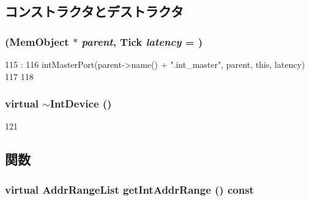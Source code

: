 \subsection{コンストラクタとデストラクタ}
\hypertarget{classX86ISA_1_1IntDevice_a860c06bf1cff1018280578ab96cdc37c}{
\subsubsection[{IntDevice}]{ ({\bf MemObject} $\ast$ {\em parent}, \/  {\bf Tick} {\em latency} = {})}}
\label{classX86ISA_1_1IntDevice_a860c06bf1cff1018280578ab96cdc37c}



\begin{DoxyCode}
115                                                     :
116         intMasterPort(parent->name() + ".int_master", parent, this, latency)
117     {
118     }

\end{DoxyCode}
\hypertarget{classX86ISA_1_1IntDevice_aa3d5db8cb913cc5f6e45e40f0d6b6f72}{
\subsubsection[{$\sim$IntDevice}]{\setlength{\rightskip}{0pt plus 5cm}virtual $\sim${\bf IntDevice} ()}}
\label{classX86ISA_1_1IntDevice_aa3d5db8cb913cc5f6e45e40f0d6b6f72}



\begin{DoxyCode}
121     {}
\end{DoxyCode}


\subsection{関数}
\hypertarget{classX86ISA_1_1IntDevice_ac142ed8f5e7f1e45022f45d316e131a3}{
\subsubsection[{getIntAddrRange}]{\setlength{\rightskip}{0pt plus 5cm}virtual {\bf AddrRangeList} getIntAddrRange () const}}
\label{classX86ISA_1_1IntDevice_ac142ed8f5e7f1e45022f45d316e131a3}


